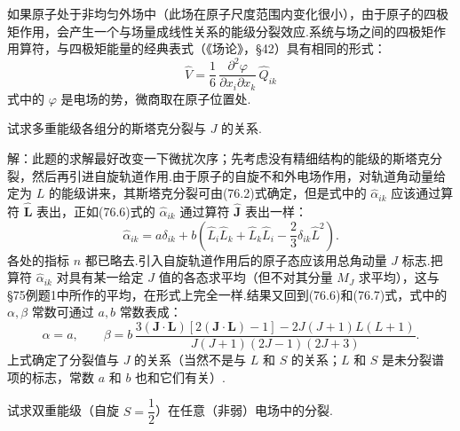 如果原子处于非均匀外场中（此场在原子尺度范围内变化很小），由于原子的四极矩作用，会产生一个与场量成线性关系的能级分裂效应.系统与场之间的四极矩作用算符，与四极矩能量的经典表式（《场论》，§42）具有相同的形式：
\begin{equation}
  \hat{V}=\frac{1}{6}\,\frac{\partial^{2}\varphi}{\partial x_i\partial x_k}\,\hat{Q}_{ik}
\end{equation}
式中的 $\varphi$ 是电场的势，微商取在原子位置处.

\begin{xiti}

\quad 试求多重能级各组分的斯塔克分裂与 $J$ 的关系.

解：此题的求解最好改变一下微扰次序；先考虑没有精细结构的能级的斯塔克分裂，然后再引进自旋轨道作用.由于原子的自旋不和外电场作用，对轨道角动量给定为 $L$ 的能级讲来，其斯塔克分裂可由(76.2)式确定，但是式中的 $\hat{\alpha}_{ik}$ 应该通过算符 $\hat{\boldsymbol{L}}$ 表出，正如(76.6)式的 $\hat{\alpha}_{ik}$ 通过算符 $\hat{\boldsymbol{J}}$ 表出一样：
\begin{equation*}
  \hat{\alpha}_{ik}=a\delta_{ik}
  +b\left(\hat{L}_i\hat{L}_k+\hat{L}_k\hat{L}_i-\frac{2}{3}\delta_{ik}\hat{L}^{2}\right).
\end{equation*}
各处的指标 $n$ 都已略去.引入自旋轨道作用后的原子态应该用总角动量 $J$ 标志.把算符 $\hat{\alpha}_{ik}$ 对具有某一给定 $J$ 值的各态求平均（但不对其分量 $M_J$ 求平均），这与§75例题1中所作的平均，在形式上完全一样.结果又回到(76.6)和(76.7)式，式中的 $\alpha,\beta$ 常数可通过 $a,b$ 常数表成：
\begin{equation*}
  \alpha=a,\qquad
  \beta=b\,\frac{3(\boldsymbol{J}\cdot\boldsymbol{L})\left[2(\boldsymbol{J}\cdot\boldsymbol{L})-1\right]
  -2J(J+1)L(L+1)}
  {J(J+1)(2J-1)(2J+3)}.
\end{equation*}
上式确定了分裂值与 $J$ 的关系（当然不是与 $L$ 和 $S$ 的关系；$L$ 和 $S$ 是未分裂谱项的标志，常数 $a$ 和 $b$ 也和它们有关）.

\quad 试求双重能级（自旋 $S=\dfrac{1}{2}$）在任意（非弱）电场中的分裂.


\end{xiti}
